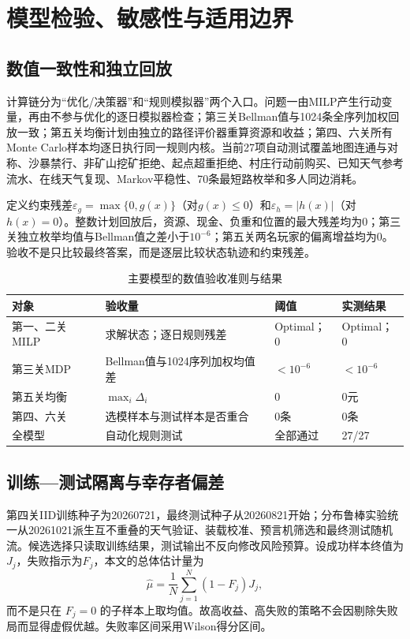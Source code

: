 \section{模型检验、敏感性与适用边界}

\subsection{数值一致性和独立回放}

计算链分为“优化/决策器”和“规则模拟器”两个入口。问题一由MILP产生行动变量，再由不参与优化的逐日模拟器检查；第三关Bellman值与1024条全序列加权回放一致；第五关均衡计划由独立的路径评价器重算资源和收益；第四、六关所有Monte Carlo样本均逐日执行同一规则内核。当前27项自动测试覆盖地图连通与对称、沙暴禁行、非矿山挖矿拒绝、起点超重拒绝、村庄行动前购买、已知天气参考流水、在线天气复现、Markov平稳性、70条最短路枚举和多人同边消耗。

定义约束残差$\varepsilon_g=\max\{0,g(x)\}$（对$g(x)\le0$）和$\varepsilon_h=|h(x)|$（对$h(x)=0$）。整数计划回放后，资源、现金、负重和位置的最大残差均为0；第三关独立枚举均值与Bellman值之差小于$10^{-6}$；第五关两名玩家的偏离增益均为0。验收不是只比较最终答案，而是逐层比较状态轨迹和约束残差。

\begin{table}[H]
\centering
\caption{主要模型的数值验收准则与结果}
\label{tab:numerical-acceptance}
\begin{tabularx}{0.96\textwidth}{L{2.0cm}Y C{2.2cm} C{2.0cm}}
\toprule
对象 & 验收量 & 阈值 & 实测结果\\
\midrule
第一、二关MILP & 求解状态；逐日规则残差 & Optimal；0 & Optimal；0\\
第三关MDP & Bellman值与1024序列加权均值差 & $<10^{-6}$ & $<10^{-6}$\\
第五关均衡 & $\max_i\Delta_i$ & 0 & 0元\\
第四、六关 & 选模样本与测试样本是否重合 & 0条 & 0条\\
全模型 & 自动化规则测试 & 全部通过 & 27/27\\
\bottomrule
\end{tabularx}
\end{table}

\subsection{训练—测试隔离与幸存者偏差}

第四关IID训练种子为20260721，最终测试种子从20260821开始；分布鲁棒实验统一从20261021派生互不重叠的天气验证、装载校准、预言机筛选和最终测试随机流。候选选择只读取训练结果，测试输出不反向修改风险预算。设成功样本终值为$J_j$，失败指示为$F_j$，本文的总体估计量为
\begin{equation}
\widehat{\mu}=\frac1N\sum_{j=1}^N (1-F_j)J_j,
\end{equation}
而不是只在 $F_j=0$ 的子样本上取均值。故高收益、高失败的策略不会因剔除失败局而显得虚假优越。失败率区间采用Wilson得分区间\cite{wilson1927}。

